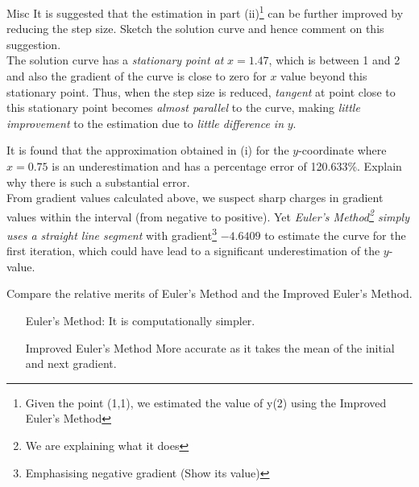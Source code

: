 \documentclass[oneside]{book}
\begin{document}
\begin{example}{Misc}{}
  It is suggested that the estimation in part (ii)\footnote{Given the point (1,1), we estimated the value of y(2) using the Improved Euler's Method} can be further improved by reducing the step size. Sketch the solution curve and hence comment on this suggestion.\\[3mm]
  The solution curve has a \emph{stationary point at} \(x=1.47\), which is between 1 and 2 and also the gradient of the curve is close to zero for \(x\) value beyond this stationary point. Thus, when the step size is reduced, \emph{tangent} at point close to this stationary point becomes \emph{almost parallel} to the curve, making \emph{little improvement} to the estimation due to \emph{little difference in} \(y\). 
\end{example}
\begin{example}{}{}
  It is found that the approximation obtained in (i) for the \(y\)-coordinate where \(x=0.75\) is an underestimation and has a percentage error of 120.633\%. Explain why there is such a substantial error.\\[3mm]
  From gradient values calculated above, we suspect sharp charges in gradient values within the interval (from negative to positive). Yet \emph{Euler's Method\footnote{We are explaining what it does} simply uses a straight line segment} with gradient\footnote{Emphasising negative gradient (Show its value)} \(-4.6409\) to estimate the curve for the first iteration, which could have lead to a significant underestimation of the \(y\)-value.
\end{example}
\begin{example}{}{}
  Compare the relative merits of Euler's Method and the Improved Euler's Method.
  \begin{enumerate}[wide=0pt, leftmargin=*]
    \item[Euler's Method:] It is computationally simpler.
    \item[Improved Euler's Method] More accurate as it takes the mean of the initial and next gradient. 
  \end{enumerate}
\end{example}
\end{document}
